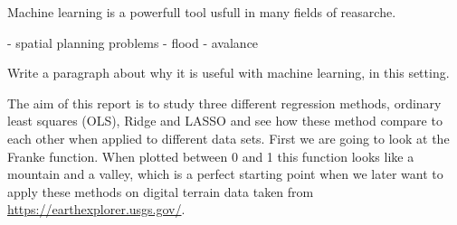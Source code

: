 \thispagestyle{plain}
Machine learning is a powerfull tool usfull in many fields of reasarche.

- spatial planning problems
- flood
- avalance

Write a paragraph about why it is useful with machine learning, in this setting.

\noindent The aim of this report is to study three different regression methods, ordinary least squares (OLS), Ridge and LASSO and see how these method compare to each other when applied to different data sets. First we are going to look at the Franke function. When plotted between 0 and 1 this function looks like a mountain and a valley, which is a perfect starting point when we later want to apply these methods on digital terrain data taken from \url{https://earthexplorer.usgs.gov/}.
